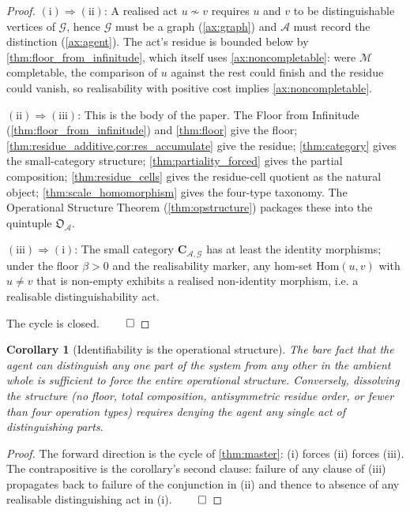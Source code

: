 \documentclass[11pt,a4paper]{article}
\theoremstyle{thmstyle}
\newtheorem{corollary}[theorem]{Corollary}
\theoremstyle{definition}
\theoremstyle{remark}
\newcommand{\Graph}{\mathcal{G}}
\newcommand{\Agent}{\mathcal{A}}
\newcommand{\floor}{\beta}
\newcommand{\OpStr}{\mathfrak{O}}
\begin{document}
\begin{proof}
$(\mathrm{i}) \Rightarrow (\mathrm{ii})$: A realised act
$u \not\sim v$ requires $u$ and $v$ to be distinguishable vertices
of $\Graph$, hence $\Graph$ must be a graph (\cref{ax:graph}) and
$\Agent$ must record the distinction (\cref{ax:agent}). The act's
residue is bounded below by \cref{thm:floor_from_infinitude}, which
itself uses \cref{ax:noncompletable}: were $\mathcal{M}$
completable, the comparison of $u$ against the rest could finish
and the residue could vanish, so realisability with positive cost
implies \cref{ax:noncompletable}.

$(\mathrm{ii}) \Rightarrow (\mathrm{iii})$: This is the body of the
paper. The Floor from Infinitude
(\cref{thm:floor_from_infinitude}) and \cref{thm:floor} give the
floor; \cref{thm:residue_additive,cor:res_accumulate} give the
residue; \cref{thm:category} gives the small-category structure;
\cref{thm:partiality_forced} gives the partial composition;
\cref{thm:residue_cells} gives the residue-cell quotient as the
natural object; \cref{thm:scale_homomorphism} gives the four-type
taxonomy. The Operational Structure Theorem
(\cref{thm:opstructure}) packages these into the quintuple
$\OpStr_\Agent$.

$(\mathrm{iii}) \Rightarrow (\mathrm{i})$: The small category
$\mathbf{C}_{\Agent,\Graph}$ has at least the identity morphisms;
under the floor $\floor > 0$ and the realisability marker, any
hom-set $\mathrm{Hom}(u, v)$ with $u \neq v$ that is non-empty
exhibits a realised non-identity morphism, i.e. a realisable
distinguishability act.

The cycle is closed. $\qed$
\end{proof}

\begin{corollary}[Identifiability is the operational structure]
\label{cor:identifiability_is_structure}
The bare fact that the agent can distinguish any one part of the
system from any other in the ambient whole is sufficient to force
the entire operational structure. Conversely, dissolving the
structure (no floor, total composition, antisymmetric residue
order, or fewer than four operation types) requires denying the
agent any single act of distinguishing parts.
\end{corollary}

\begin{proof}
The forward direction is the cycle of \cref{thm:master}: (i) forces
(ii) forces (iii). The contrapositive is the corollary's second
clause: failure of any clause of (iii) propagates back to failure
of the conjunction in (ii) and thence to absence of any realisable
distinguishing act in (i). $\qed$
\end{proof}
\end{document}
